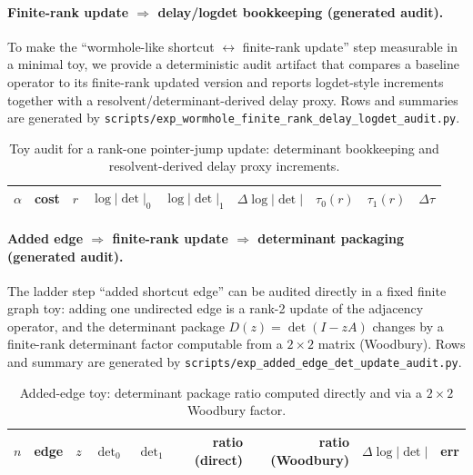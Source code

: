 \paragraph{Finite-rank update $\Rightarrow$ delay/logdet bookkeeping (generated audit).}
\AuditTag To make the ``wormhole-like shortcut $\leftrightarrow$ finite-rank update'' step measurable in a minimal toy,
we provide a deterministic audit artifact that compares a baseline operator to its finite-rank updated version and reports
logdet-style increments together with a resolvent/determinant-derived delay proxy.
Rows and summaries are generated by \texttt{scripts/exp\_wormhole\_finite\_rank\_delay\_logdet\_audit.py}.

\begin{table}[t]
\centering
\scriptsize
\setlength{\tabcolsep}{6pt}
\renewcommand{\arraystretch}{1.15}
\begin{tabular}{r r r r r r r r r}
\toprule
$\alpha$ & cost & $r$ & $\log|\det|_0$ & $\log|\det|_1$ & $\Delta\log|\det|$ & $\tau_0(r)$ & $\tau_1(r)$ & $\Delta\tau$ \\
\midrule

\end{tabular}
\caption{Toy audit for a rank-one pointer-jump update: determinant bookkeeping and resolvent-derived delay proxy increments.}
\label{tab:wormhole_finite_rank_delay_logdet_audit}
\end{table}

%

\paragraph{Added edge $\Rightarrow$ finite-rank update $\Rightarrow$ determinant packaging (generated audit).}
\AuditTag The ladder step ``added shortcut edge'' can be audited directly in a fixed finite graph toy:
adding one undirected edge is a rank-2 update of the adjacency operator, and the determinant package
$D(z)=\det(I-zA)$ changes by a finite-rank determinant factor computable from a $2\times2$ matrix (Woodbury).
Rows and summary are generated by \texttt{scripts/exp\_added\_edge\_det\_update\_audit.py}.

\begin{table}[t]
\centering
\scriptsize
\setlength{\tabcolsep}{6pt}
\renewcommand{\arraystretch}{1.15}
\begin{tabular}{r r r r r r r r r}
\toprule
$n$ & edge & $z$ & $\det_0$ & $\det_1$ & ratio (direct) & ratio (Woodbury) & $\Delta\log|\det|$ & err \\
\midrule

\end{tabular}
\caption{Added-edge toy: determinant package ratio computed directly and via a $2\times2$ Woodbury factor.}
\label{tab:added_edge_det_update_audit}
\end{table}

